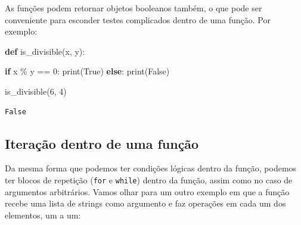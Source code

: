 \documentclass[
  brazilian,
  letterpaper,
  DIV=11,
  numbers=noendperiod]{scrreprt}
\newenvironment{Shaded}{\begin{snugshade}}{\end{snugshade}}
\newcommand{\BuiltInTok}[1]{\textcolor[rgb]{0.00,0.23,0.31}{#1}}
\newcommand{\ControlFlowTok}[1]{\textcolor[rgb]{0.00,0.23,0.31}{\textbf{#1}}}
\newcommand{\DecValTok}[1]{\textcolor[rgb]{0.68,0.00,0.00}{#1}}
\newcommand{\KeywordTok}[1]{\textcolor[rgb]{0.00,0.23,0.31}{\textbf{#1}}}
\newcommand{\NormalTok}[1]{\textcolor[rgb]{0.00,0.23,0.31}{#1}}
\newcommand{\OperatorTok}[1]{\textcolor[rgb]{0.37,0.37,0.37}{#1}}
\newcommand{\VariableTok}[1]{\textcolor[rgb]{0.07,0.07,0.07}{#1}}
\begin{document}
As funções podem retornar objetos booleanos também, o que pode ser
conveniente para esconder testes complicados dentro de uma função. Por
exemplo:

\begin{Shaded}
\begin{Highlighting}[]
\KeywordTok{def}\NormalTok{ is\_divisible(x, y):}
    
    \ControlFlowTok{if}\NormalTok{ x }\OperatorTok{\%}\NormalTok{ y }\OperatorTok{==} \DecValTok{0}\NormalTok{:}
        \BuiltInTok{print}\NormalTok{(}\VariableTok{True}\NormalTok{)}
    \ControlFlowTok{else}\NormalTok{:}
        \BuiltInTok{print}\NormalTok{(}\VariableTok{False}\NormalTok{)}
    
\NormalTok{is\_divisible(}\DecValTok{6}\NormalTok{, }\DecValTok{4}\NormalTok{)}
\end{Highlighting}
\end{Shaded}

\begin{verbatim}
False
\end{verbatim}

\subsection{Iteração dentro de uma
função}\label{iterauxe7uxe3o-dentro-de-uma-funuxe7uxe3o}

Da mesma forma que podemos ter condições lógicas dentro da função,
podemos ter blocos de repetição (\texttt{for} e \texttt{while}) dentro
da função, assim como no caso de argumentos arbitrários. Vamos olhar
para um outro exemplo em que a função recebe uma lista de strings como
argumento e faz operações em cada um dos elementos, um a um:
\end{document}
